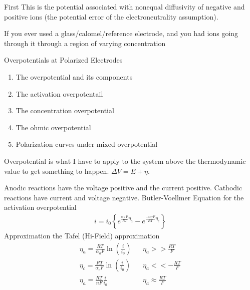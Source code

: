 \documentclass{article}
\begin{document}
\begin{section}{First}
	This is the potential associated with nonequal diffusivity of negative and positive ions (the potential error of the electroneutrality assumption).

	If you ever used a glass/calomel/reference electrode, and you had ions going through it through a region of varying concentration
\end{section}
\begin{section}{Overpotentials at Polarized Electrodes}
	\begin{enumerate}
		\item The overpotential and its components
		\item The activation overpotentail
		\item The concentration overpotential
		\item The ohmic overpotential
		\item Polarization curves under mixed overpotential
	\end{enumerate}

	Overpotential is what I have to apply to the system above the thermodynamic value to get something to happen. $\Delta V = E + \eta$.

	Anodic reactions have the voltage positive and the current positive. Cathodic reactions have current and voltage negative. Butler-Voellmer Equation for the activation overpotential
	\begin{align}
		i = i_0 \left\{e^{\frac{\alpha_{A} F}{RT}\eta_a} - e^{\frac{-\alpha_{C}F}{RT}\eta_c}\right\}
		\label{Eqn:Butler-Voellmer}
	\end{align}
	Approximation the Tafel (Hi-Field) approximation
	\begin{align*}
		\eta_a = \frac{RT}{\alpha_a F}\ln{\left(\frac{i}{i_0}\right)} & & \eta_a >> \frac{RT}{F}\\
		\eta_c = \frac{RT}{\alpha_c F}\ln{\left(\frac{i}{i_0}\right)} & & \eta_a << -\frac{RT}{F}\\
		\eta_a = \frac{RT}{nF}\frac{i}{i_0}                           & & \eta_a \approx \frac{RT}{F}
	\end{align*}
\end{section}
\end{document}
